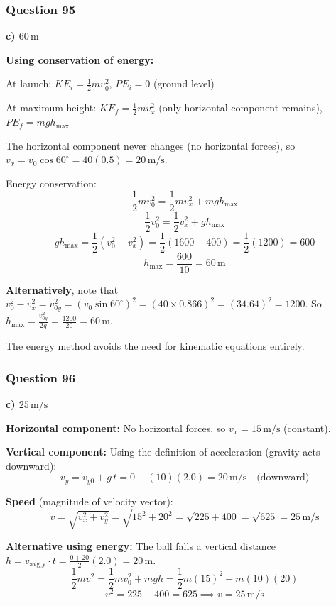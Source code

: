 \documentclass[12pt,letterpaper]{article}
\begin{document}
\subsubsection*{Question 95}

\begin{answerbox}
\textbf{c) $60\,\text{m}$}
\end{answerbox}

\begin{explanationbox}
\textbf{Using conservation of energy:}

At launch: $KE_i = \frac{1}{2}mv_0^2$, $PE_i = 0$ (ground level)

At maximum height: $KE_f = \frac{1}{2}mv_x^2$ (only horizontal component remains), $PE_f = mgh_{\max}$

The horizontal component never changes (no horizontal forces), so $v_x = v_0\cos 60^\circ = 40(0.5) = 20\,\text{m/s}$.

Energy conservation:
\[
\frac{1}{2}mv_0^2 = \frac{1}{2}mv_x^2 + mgh_{\max}
\]
\[
\frac{1}{2}v_0^2 = \frac{1}{2}v_x^2 + gh_{\max}
\]
\[
gh_{\max} = \frac{1}{2}(v_0^2 - v_x^2) = \frac{1}{2}(1600 - 400) = \frac{1}{2}(1200) = 600
\]
\[
h_{\max} = \frac{600}{10} = 60\,\text{m}
\]

\textbf{Alternatively}, note that $v_0^2 - v_x^2 = v_{0y}^2 = (v_0\sin 60^\circ)^2 = (40 \times 0.866)^2 = (34.64)^2 = 1200$. So $h_{\max} = \frac{v_{0y}^2}{2g} = \frac{1200}{20} = 60\,\text{m}$.

The energy method avoids the need for kinematic equations entirely.
\end{explanationbox}

\subsubsection*{Question 96}

\begin{answerbox}
\textbf{c) $25\,\text{m/s}$}
\end{answerbox}

\begin{explanationbox}
\textbf{Horizontal component:} No horizontal forces, so $v_x = 15\,\text{m/s}$ (constant).

\textbf{Vertical component:} Using the definition of acceleration (gravity acts downward):
\[
v_y = v_{y0} + g\,t = 0 + (10)(2.0) = 20\,\text{m/s} \quad \text{(downward)}
\]

\textbf{Speed} (magnitude of velocity vector):
\[
v = \sqrt{v_x^2 + v_y^2} = \sqrt{15^2 + 20^2} = \sqrt{225 + 400} = \sqrt{625} = 25\,\text{m/s}
\]

\textbf{Alternative using energy:} The ball falls a vertical distance $h = v_{\text{avg,y}} \cdot t = \frac{0+20}{2}(2.0) = 20\,\text{m}$.
\[
\frac{1}{2}mv^2 = \frac{1}{2}mv_0^2 + mgh = \frac{1}{2}m(15)^2 + m(10)(20)
\]
\[
v^2 = 225 + 400 = 625 \implies v = 25\,\text{m/s}
\]
\end{explanationbox}
\end{document}

